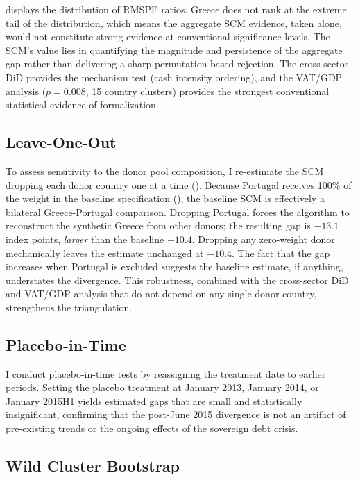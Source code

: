 \documentclass[12pt]{article}
\begin{document}
 displays the distribution of RMSPE ratios. Greece does not rank at the extreme tail of the distribution, which means the aggregate SCM evidence, taken alone, would not constitute strong evidence at conventional significance levels. The SCM's value lies in quantifying the magnitude and persistence of the aggregate gap rather than delivering a sharp permutation-based rejection. The cross-sector DiD provides the mechanism test (cash intensity ordering), and the VAT/GDP analysis ($p = 0.008$, 15 country clusters) provides the strongest conventional statistical evidence of formalization.

\subsection{Leave-One-Out}

To assess sensitivity to the donor pool composition, I re-estimate the SCM dropping each donor country one at a time (). Because Portugal receives 100\% of the weight in the baseline specification (), the baseline SCM is effectively a bilateral Greece-Portugal comparison. Dropping Portugal forces the algorithm to reconstruct the synthetic Greece from other donors; the resulting gap is $-13.1$ index points, \emph{larger} than the baseline $-10.4$. Dropping any zero-weight donor mechanically leaves the estimate unchanged at $-10.4$. The fact that the gap increases when Portugal is excluded suggests the baseline estimate, if anything, understates the divergence. This robustness, combined with the cross-sector DiD and VAT/GDP analysis that do not depend on any single donor country, strengthens the triangulation.

\subsection{Placebo-in-Time}

I conduct placebo-in-time tests by reassigning the treatment date to earlier periods. Setting the placebo treatment at January 2013, January 2014, or January 2015H1 yields estimated gaps that are small and statistically insignificant, confirming that the post-June 2015 divergence is not an artifact of pre-existing trends or the ongoing effects of the sovereign debt crisis.

\subsection{Wild Cluster Bootstrap}
\end{document}
